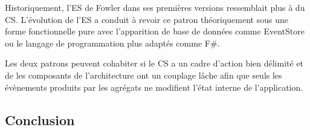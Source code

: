 Historiquement, l'\gls{ES} de Fowler dans ses premières versions ressemblait plus 
à du \gls{CS}. L'évolution de l'\gls{ES} a conduit à revoir ce patron théoriquement 
sous une forme fonctionnelle pure avec l'apparition de base de données comme 
EventStore ou le langage de programmation plus adaptés comme F\#.

Les deux patrons peuvent cohabiter si le \gls{CS} a un cadre d'action bien délimité 
et de les composants de l'architecture ont un couplage lâche afin que seuls les 
évènements produits par les agrégats ne modifient l'état interne de l'application. 


\subsection{Conclusion}

